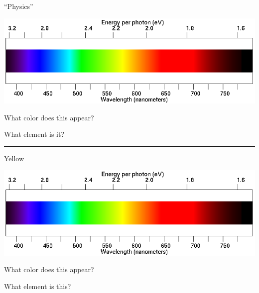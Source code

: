 \documentclass[11pt]{article}
\begin{document}
\begin{minipage}{0.1\textwidth}
	\begin{center}
		\large ``Physics''
	\end{center}
\end{minipage}
\begin{minipage}{0.8\textwidth}
	\includegraphics[width=\textwidth]{spectrum2.png}
\end{minipage}

\begin{minipage}{0.5\textwidth}
	What color does this appear?
\end{minipage}
\begin{minipage}{0.5\textwidth}
	What element is it?
\end{minipage}

\vspace{0.7in}
\hrule



\begin{minipage}{0.1\textwidth}
	\begin{center}
		\large Yellow
	\end{center}
\end{minipage}
\begin{minipage}{0.8\textwidth}
	\includegraphics[width=\textwidth]{spectrum2.png}
\end{minipage}

\begin{minipage}{0.5\textwidth}
	What color does this appear?
\end{minipage}
\begin{minipage}{0.5\textwidth}
	What element is this?
\end{minipage}
\begin{minipage}{0.5\textwidth}
\end{minipage}
\end{document}
